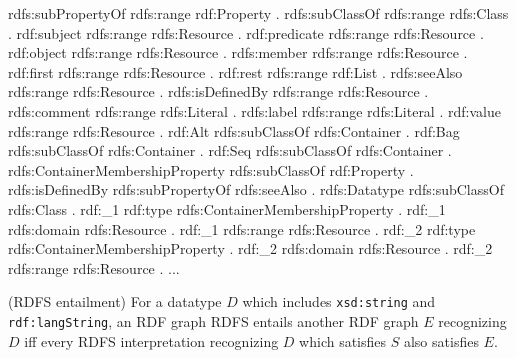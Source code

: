 \documentclass{article}
\begin{document}
\begin{defin}
{rdfs:subPropertyOf rdfs:range rdf:Property .\newline
rdfs:subClassOf rdfs:range rdfs:Class .\newline
rdf:subject rdfs:range rdfs:Resource .\newline
rdf:predicate rdfs:range rdfs:Resource .\newline
rdf:object rdfs:range rdfs:Resource .\newline
rdfs:member rdfs:range rdfs:Resource .\newline
rdf:first rdfs:range rdfs:Resource .\newline
rdf:rest rdfs:range rdf:List .\newline
rdfs:seeAlso rdfs:range rdfs:Resource .\newline
rdfs:isDefinedBy rdfs:range rdfs:Resource .\newline
rdfs:comment rdfs:range rdfs:Literal .\newline
rdfs:label rdfs:range rdfs:Literal .\newline
rdf:value rdfs:range rdfs:Resource . \newline
\newline
rdf:Alt rdfs:subClassOf rdfs:Container . \newline
rdf:Bag rdfs:subClassOf rdfs:Container . \newline
rdf:Seq rdfs:subClassOf rdfs:Container . \newline
rdfs:ContainerMembershipProperty rdfs:subClassOf rdf:Property . \newline
\newline
rdfs:isDefinedBy rdfs:subPropertyOf rdfs:seeAlso . \newline
\newline
rdfs:Datatype rdfs:subClassOf rdfs:Class . \newline
\newline
rdf:\_1 rdf:type rdfs:ContainerMembershipProperty . \newline
rdf:\_1 rdfs:domain rdfs:Resource . \newline
rdf:\_1 rdfs:range rdfs:Resource . \newline 
rdf:\_2 rdf:type rdfs:ContainerMembershipProperty . \newline
rdf:\_2 rdfs:domain rdfs:Resource . \newline
rdf:\_2 rdfs:range rdfs:Resource .  \newline
... 
}
\end{defin}

\begin{defin}(RDFS entailment)\newline
For a datatype $D$ which includes \texttt{xsd:string} and \texttt{rdf:langString}, an RDF graph RDFS entails another RDF graph $E$ recognizing $D$ iff every RDFS interpretation recognizing $D$ which satisfies $S$ also satisfies $E$.

\end{defin}
\end{document}
